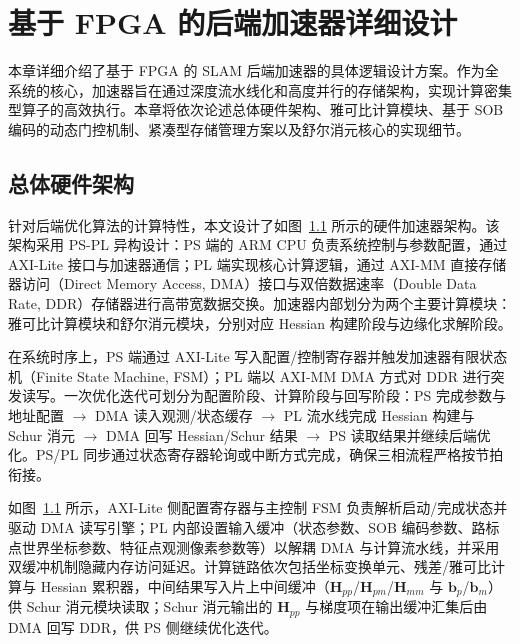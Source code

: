 \chapter{基于 FPGA 的后端加速器详细设计}\label{chap:hardware_design}

本章详细介绍了基于 FPGA 的 SLAM 后端加速器的具体逻辑设计方案。作为全系统的核心，加速器旨在通过深度流水线化和高度并行的存储架构，实现计算密集型算子的高效执行。本章将依次论述总体硬件架构、雅可比计算模块、基于 SOB 编码的动态门控机制、紧凑型存储管理方案以及舒尔消元核心的实现细节。

\section{总体硬件架构}

针对后端优化算法的计算特性，本文设计了如图~\ref{fig:ba_core_arch} 所示的硬件加速器架构。该架构采用 PS-PL 异构设计：PS 端的 ARM CPU 负责系统控制与参数配置，通过 AXI-Lite 接口与加速器通信；PL 端实现核心计算逻辑，通过 AXI-MM 直接存储器访问（Direct Memory Access, DMA）接口与双倍数据速率（Double Data Rate, DDR）存储器进行高带宽数据交换。加速器内部划分为两个主要计算模块：雅可比计算模块和舒尔消元模块，分别对应 Hessian 构建阶段与边缘化求解阶段。

在系统时序上，PS 端通过 AXI-Lite 写入配置/控制寄存器并触发加速器有限状态机（Finite State Machine, FSM）；PL 端以 AXI-MM DMA 方式对 DDR 进行突发读写。一次优化迭代可划分为配置阶段、计算阶段与回写阶段：PS 完成参数与地址配置 $\rightarrow$ DMA 读入观测/状态缓存 $\rightarrow$ PL 流水线完成 Hessian 构建与 Schur 消元 $\rightarrow$ DMA 回写 Hessian/Schur 结果 $\rightarrow$ PS 读取结果并继续后端优化。PS/PL 同步通过状态寄存器轮询或中断方式完成，确保三相流程严格按节拍衔接。

如图~\ref{fig:ba_core_arch} 所示，AXI-Lite 侧配置寄存器与主控制 FSM 负责解析启动/完成状态并驱动 DMA 读写引擎；PL 内部设置输入缓冲（状态参数、SOB 编码参数、路标点世界坐标参数、特征点观测像素参数等）以解耦 DMA 与计算流水线，并采用双缓冲机制隐藏内存访问延迟。计算链路依次包括坐标变换单元、残差/雅可比计算与 Hessian 累积器，中间结果写入片上中间缓冲（$\mathbf{H}_{pp}$/$\mathbf{H}_{pm}$/$\mathbf{H}_{mm}$ 与 $\mathbf{b}_p$/$\mathbf{b}_m$）供 Schur 消元模块读取；Schur 消元输出的 $\mathbf{H}_{pp}$ 与梯度项在输出缓冲汇集后由 DMA 回写 DDR，供 PS 侧继续优化迭代。

\begin{figure}[htbp]
    \centering
    \resizebox{0.95\linewidth}{!}{}
    \label{fig:ba_core_arch}
\end{figure}


